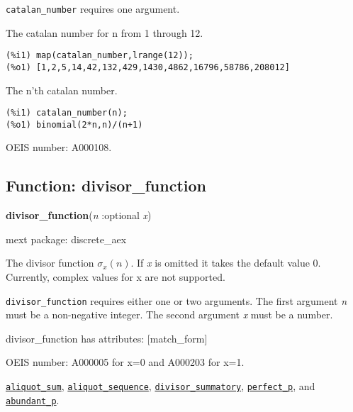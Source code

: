 \documentclass[]{article}
\begin{document}
\vspace{5 pt}

   {\tt catalan\_number} requires one argument.


\vspace{5 pt}


   The catalan number for n from 1 through 12. 

\begin{Verbatim}[frame=single]
(%i1) map(catalan_number,lrange(12));
(%o1) [1,2,5,14,42,132,429,1430,4862,16796,58786,208012]
\end{Verbatim}

   The n'th catalan number. 

\begin{Verbatim}[frame=single]
(%i1) catalan_number(n);
(%o1) binomial(2*n,n)/(n+1)
\end{Verbatim}


OEIS number: A000108.


\subsection{Function: divisor\_function\label{sec:divisor_function}}
\hypertarget{divisor_function}{}
{\bf divisor\_function}({\it n} :optional {\it x})


\noindent mext package: discrete\_aex



\vspace{5 pt}
The divisor function $\sigma_x(n)$. If {\it x} is omitted it takes the default value $0$. Currently, complex values for x are not supported. 

\vspace{5 pt}

   {\tt divisor\_function} requires either one or two arguments.
    The first argument {\it n} must be a non-negative integer.
    The second argument {\it x} must be a number.


\vspace{5 pt}

divisor\_function has attributes: [match\_form]

\vspace{5 pt}


OEIS number: A000005 for x=0 and A000203 for x=1.


  \hyperlink{aliquot_sum}{{\tt aliquot\_sum}}, \hyperlink{aliquot_sequence}{{\tt aliquot\_sequence}}, \hyperlink{divisor_summatory}{{\tt divisor\_summatory}}, \hyperlink{perfect_p}{{\tt perfect\_p}}, and \hyperlink{abundant_p}{{\tt abundant\_p}}.
\end{document}
